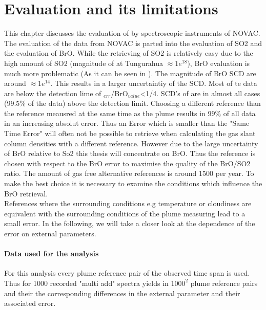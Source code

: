 \documentclass  [
  paper    = a4,
  BCOR     = 10mm,
  twoside,
  fontsize = 12pt,
  fleqn,
  toc      = bibnumbered,
  toc      = listofnumbered,
  numbers  = noendperiod,
  headings = normal,
  listof   = leveldown,
  version  = 3.03
]                                       {scrreprt}
\begin{document}
	\chapter{  Evaluation and its limitations}
	This chapter discusses the evaluation of   by spectroscopic instruments of NOVAC.\\
	The evaluation of the data from NOVAC is parted into the evaluation of SO2 and the evaluation of BrO. While the retrieving of SO2 is relatively easy due to the high amount of SO2  (magnitude of  at Tungurahua $\approx 1e^{18}$), BrO evaluation is much more problematic (As it can be seen in ). The magnitude of BrO SCD are around $\approx 1e^{14}$. 
	This results in a larger uncertaintiy of the   SCD. Most of te   data are below the detection lime of $_{err}$/BrO$_{value}$<1/4. SCD's of   are in almost all cases (99.5\% of the data) above the detection limit. 
	Choosing a different reference than the reference meausred at the same time as the plume results in 99\% of all data in an increasing absolut error. 
	Thus an  Error which is smaller than the "Same Time Error" will often not be possible to retrieve when calculating the gas slant column densities with a different reference. However due to the large uncertainty of BrO relative to So2 this thesis will concentrate on BrO. Thus the reference is chosen with respect to the BrO error to maximise the quality of the BrO/SO2 ratio. The amount of gas free alternative references is around 1500 per year. To make the best choice it is necessary to examine the conditions which influence the BrO retrieval.
	\\
	References where the surrounding conditions e.g temperature or cloudiness are equivalent with the surrounding conditions of the  plume measuring lead to a small error.
	In the following, we will take a closer look at the dependence of the  error on external parameters. 
	\subsubsection*{Data used for the analysis}
	For this analysis every plume reference pair of the observed time span is used. Thus for 1000 recorded "multi add" spectra yields in $1000^2$ plume reference pairs and their the corresponding differences in the external parameter and their associated  error.
\end{document}
